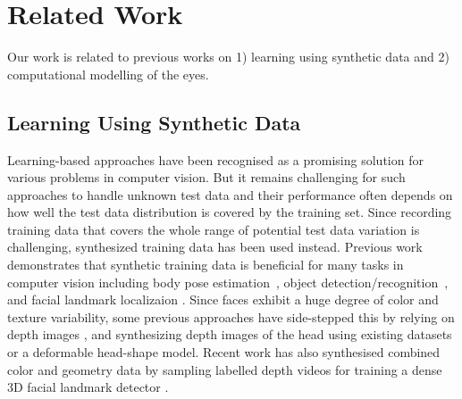 
\section{Related Work}

Our work is related to previous works on 1) learning using synthetic data and 2) computational modelling of the eyes.

\subsection{Learning Using Synthetic Data}

Learning-based approaches have been recognised as a promising solution for various problems in computer vision.
But it remains challenging for such approaches to handle unknown test data and their performance often depends on how well the test data distribution is covered by the training set.
Since recording training data that covers the whole range of potential test data variation is challenging,
synthesized training data has been used instead.
Previous work demonstrates that synthetic training data is beneficial for many tasks in computer vision including body pose estimation~\cite{okada2008relevant,shotton2013real}, object detection/recognition~\cite{yu2010improving,liebelt2010multiview}, and facial landmark localizaion \cite{kaneva2011evaluation,baltrusaitis20123d,zface}.
%
Since faces exhibit a huge degree of color and texture variability, some previous approaches have side-stepped this by relying on depth images \cite{fanelli2011real,baltrusaitis20123d}, and synthesizing depth images of the head using existing datasets or a deformable head-shape model. Recent work has also synthesised combined color and geometry data by sampling labelled depth videos for training a dense 3D facial landmark detector \cite{zface}.

